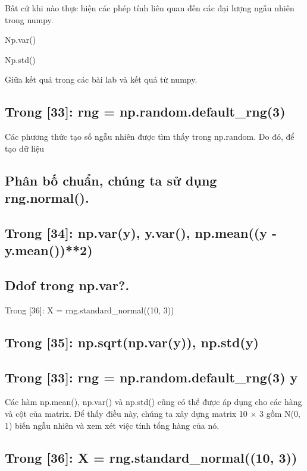 Bất cứ khi nào thực hiện các phép tính liên quan đến các đại lượng ngẫu nhiên trong numpy.

Np.var()

Np.std()

Giữa kết quả trong các bài lab và kết quả từ numpy.

\subsection{Trong [33]: rng = np.random.default\_rng(3)}

Các phương thức tạo số ngẫu nhiên được tìm thấy trong np.random. Do đó, để tạo dữ liệu

\subsection{Phân bố chuẩn, chúng ta sử dụng rng.normal().}

\subsection{Trong [34]: np.var(y), y.var(), np.mean((y - y.mean())**2)}

\subsection{Ddof trong np.var?.}

Trong [36]: X = rng.standard\_normal((10, 3))

\subsection{Trong [35]: np.sqrt(np.var(y)), np.std(y)}

\subsection{Trong [33]: rng = np.random.default\_rng(3) y}

Các hàm np.mean(), np.var() và np.std() cũng có thể được áp dụng cho các hàng và cột của matrix. Để thấy điều này, chúng ta xây dựng matrix 10 × 3 gồm N(0, 1) biến ngẫu nhiên và xem xét việc tính tổng hàng của nó.

\subsection{Trong [36]: X = rng.standard\_normal((10, 3))}


